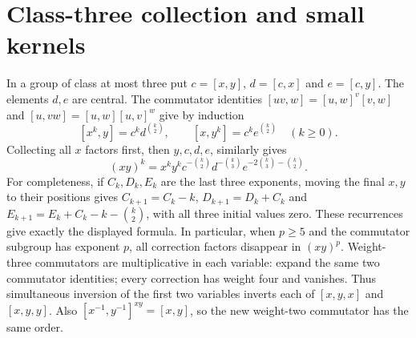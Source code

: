 \section{Class-three collection and small kernels}
In a group of class at most three put $c=[x,y]$, $d=[c,x]$ and
$e=[c,y]$. The elements $d,e$ are central. The commutator identities
$[uv,w]=[u,w]^v[v,w]$ and $[u,vw]=[u,w][u,v]^w$
give by induction
\[
[x^k,y]=c^k d^{\binom k2},\qquad [x,y^k]=c^k e^{\binom k2}
\quad(k\geq0).
\]
Collecting all $x$ factors first, then $y,c,d,e$, similarly gives
\[
(xy)^k=x^ky^k c^{-\binom k2}d^{-\binom k3}
                 e^{-2\binom k3-\binom k2}.
\]
For completeness, if $C_k,D_k,E_k$ are the last three exponents,
moving the final $x,y$ to their positions gives
$C_{k+1}=C_k-k$, $D_{k+1}=D_k+C_k$ and
$E_{k+1}=E_k+C_k-k-\binom k2$, with all three initial values zero.
These recurrences give exactly the displayed formula.
In particular, when $p\geq5$ and the commutator subgroup has
exponent $p$, all correction factors disappear in $(xy)^p$.
Weight-three commutators are multiplicative in each variable:
expand the same two commutator identities; every correction has
weight four and vanishes. Thus simultaneous inversion of the first
two variables inverts each of $[x,y,x]$ and $[x,y,y]$.
Also $[x^{-1},y^{-1}]^{xy}=[x,y]$, so the new weight-two
commutator has the same order.


